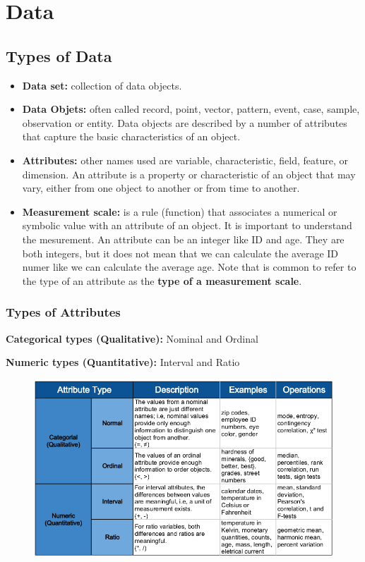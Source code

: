 \chapter{Data}
\clearpage

\section{Types of Data}
	
	\begin{itemize}
		\item {\bf Data set: } collection of data objects.
		\item {\bf Data Objets: } often called record, point, vector, pattern, event, case,
		sample, observation or entity. Data objects are described by a number of attributes
		that capture the basic characteristics of an object.
		\item {\bf Attributes: } other names used are variable, characteristic, field, feature, 
		or dimension. An attribute is a property or characteristic of an object that may
		vary, either from one object to another or from time to another.
		\item {\bf Measurement scale: } is a rule (function) that associates a numerical or
		symbolic value with an attribute of an object. It is important to understand the 
		mesurement. An attribute can be an integer like ID and age. They are both integers, 
		but it does not mean that we can calculate the average ID numer like we can calculate
		the average age. Note that is common to refer to the type of an attribute as the
		{\bf type of a measurement scale}.
	\end{itemize}

	\subsection*{Types of Attributes}
	{\bf Categorical types (Qualitative):} Nominal and Ordinal

	{\bf Numeric types (Quantitative):} Interval and Ratio

		\begin{figure}[H]
			\includegraphics[width=\textwidth]{pics/typeOfAttributes.png}
		\end{figure}

